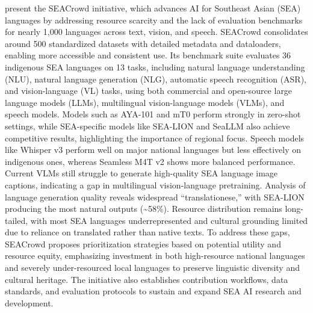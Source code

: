 \documentclass[acmsmall]{acmart}
\begin{document}
\citep{lovenia2025seacrowdmultilingualmultimodaldata} present the SEACrowd initiative, which advances AI for Southeast Asian (SEA) languages by addressing resource scarcity and the lack of evaluation benchmarks for nearly 1,000 languages across text, vision, and speech. SEACrowd consolidates around 500 standardized datasets with detailed metadata and dataloaders, enabling more accessible and consistent use. Its benchmark suite evaluates 36 indigenous SEA languages on 13 tasks, including natural language understanding (NLU), natural language generation (NLG), automatic speech recognition (ASR), and vision-language (VL) tasks, using both commercial and open-source large language models (LLMs), multilingual vision-language models (VLMs), and speech models. Models such as AYA-101 and mT0 perform strongly in zero-shot settings, while SEA-specific models like SEA-LION and SeaLLM also achieve competitive results, highlighting the importance of regional focus. Speech models like Whisper v3 perform well on major national languages but less effectively on indigenous ones, whereas Seamless M4T v2 shows more balanced performance. Current VLMs still struggle to generate high-quality SEA language image captions, indicating a gap in multilingual vision-language pretraining. Analysis of language generation quality reveals widespread “translationese,” with SEA-LION producing the most natural outputs (\textasciitilde 58\%). Resource distribution remains long-tailed, with most SEA languages underrepresented and cultural grounding limited due to reliance on translated rather than native texts. To address these gaps, SEACrowd proposes prioritization strategies based on potential utility and resource equity, emphasizing investment in both high-resource national languages and severely under-resourced local languages to preserve linguistic diversity and cultural heritage. The initiative also establishes contribution workflows, data standards, and evaluation protocols to sustain and expand SEA AI research and development.
\end{document}
